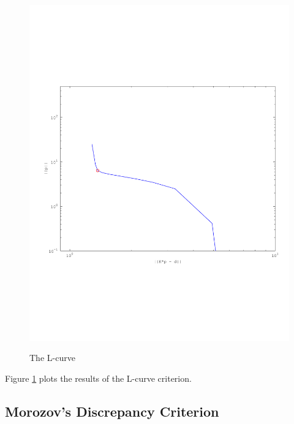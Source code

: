 \documentclass{article}
\begin{document}
\begin{figure}[!htb]
  \includegraphics[scale=.5]{plots/L-curve.pdf}
  \label{fig:data}
  \caption{The L-curve} 
 \label{fig:lcurve}
\end{figure}

Figure \ref{fig:lcurve} plots the results of the L-curve criterion.


\subsection{Morozov's Discrepancy Criterion}
\end{document}
